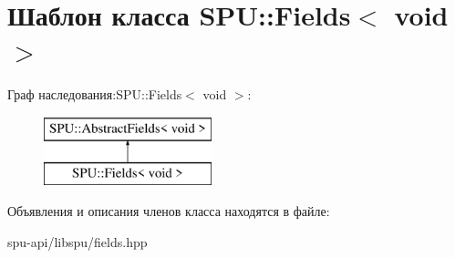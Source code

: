 \hypertarget{class_s_p_u_1_1_fields_3_01void_01_4}{}\section{Шаблон класса S\+PU\+:\+:Fields$<$ void $>$}
\label{class_s_p_u_1_1_fields_3_01void_01_4}
Граф наследования\+:S\+PU\+:\+:Fields$<$ void $>$\+:\begin{figure}[H]
\begin{center}
\leavevmode
\includegraphics[height=2.000000cm]{class_s_p_u_1_1_fields_3_01void_01_4}
\end{center}
\end{figure}


Объявления и описания членов класса находятся в файле\+:\begin{DoxyCompactItemize}
\item 
spu-\/api/libspu/fields.\+hpp\end{DoxyCompactItemize}
